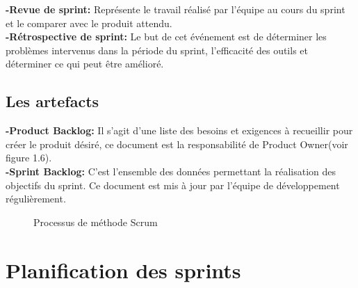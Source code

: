\noindent \textbf{\Large -Revue de sprint: }  Représente le travail réalisé par l’équipe au cours du sprint et le comparer avec le produit attendu.\\[0.1cm]

\noindent \textbf{\Large -Rétrospective de sprint: } Le but de cet événement est de déterminer les problèmes intervenus dans la période du sprint, l’efficacité des outils et déterminer ce qui peut être amélioré.

\subsection{ \selectfont\Large Les artefacts}

\noindent \textbf{\Large -Product Backlog: }
  Il s’agit d’une liste des besoins et exigences à recueillir pour créer le produit désiré, ce document est la responsabilité de Product Owner(voir figure 1.6).\\[0.1cm]

\noindent \textbf{\Large -Sprint Backlog: } C’est l’ensemble des données permettant la réalisation des objectifs du sprint. Ce document est mis à jour par l’équipe de développement régulièrement.

\begin{figure}[H]
    \begin{center}
    \end{center}
    \caption{Processus de méthode Scrum}
\end{figure}


\section{\selectfont\Large Planification des sprints}
 
